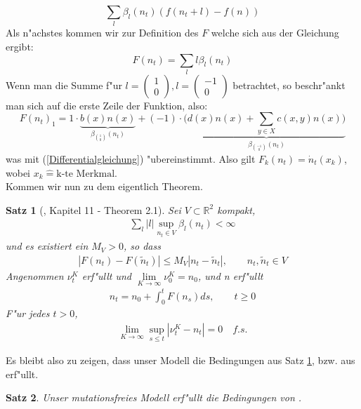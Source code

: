 \documentclass[11pt,a4paper]{article}
\theoremstyle{plain}
\newtheorem{satz}{Satz}
\newcommand{\tvec}[2]{\begin{pmatrix}#1\\#2\end{pmatrix}}
\begin{document}
\[ \sum_l \beta_l(n_t)(f(n_t + l) - f(n)) \]
Als n"achstes kommen wir zur Definition des $ F $ welche sich aus der Gleichung \cite[Kapitel 6 - (2.2)]{ethier2009markov} ergibt:
\[ F(n_t) = \sum_l l \beta_l (n_t) \]
Wenn man die Summe f"ur $ l = \tvec{1}{0}, l = \tvec{-1}{0} $ betrachtet, so beschr"ankt man sich auf die erste Zeile der Funktion, also:
\[ F(n_t)_1 = 1 \cdot \underbrace{b(x)n(x)}_{\beta_{\binom{1}{0}} (n_t)} +  (-1) \cdot ( \underbrace{d(x)n(x) + \sum_{y \in X} c(x,y)n(x))}_{\beta_{\binom{-1}{0}} (n_t)} \]
was mit (\ref{Differentialgleichung}) "ubereinstimmt. Also gilt $ F_k(n_t) = \dot{n}_t(x_k) $, wobei $ x_k \hat{=} \text{k-te Merkmal} $.\\
Kommen wir nun zu dem eigentlich Theorem.

\begin{satz}[\cite{ethier2009markov}, Kapitel 11 - Theorem 2.1]\label{Konvegenzsatz}
	Sei $ V \subset \mathbb{R}^2 $ kompakt,
	\begin{align}
		\sum_l |l| \sup_{n_t \in V} \beta_l(n_t) < \infty \label{RatenEndlich}
	\end{align}
	und es existiert ein $ M_V > 0 $, so dass
	\begin{align}
		|F(n_t) - F(\tilde{n}_t)| \le M_V|n_t - \tilde{n}_t|, \qquad n_t, \tilde{n}_t \in V \label{Lipschitz}
	\end{align}
	Angenommen $ \nu_t^K $ erf"ullt \cite[Kapitel 11 - (2.3)]{ethier2009markov} und $ \lim\limits_{K \to \infty} \nu_0^K = n_0 $, und n erf"ullt
	\begin{align}
		n_t = n_0 + \int_{0}^{t} F(n_s) ds, \qquad t \ge 0 \label{Integralgleichung}
	\end{align}
	F"ur jedes $ t > 0 $,
	\begin{align}
		\lim\limits_{K \to \infty} \sup_{s \le t} | \nu_t^K - n_t | = 0 \quad f.s. \label{Kovergenzbehauptung}
	\end{align}
\end{satz}

Es bleibt also zu zeigen, dass unser Modell die Bedingungen aus Satz \ref{Konvegenzsatz}, bzw. aus \cite[Kap. 11 - \textbf{Theorem 2.1}]{ethier2009markov} erf"ullt.

\begin{satz}
	Unser mutationsfreies Modell erf"ullt die Bedingungen von \cite[Kap. 11 - \textbf{Theorem 2.1}]{ethier2009markov}.
\end{satz}
\end{document}
